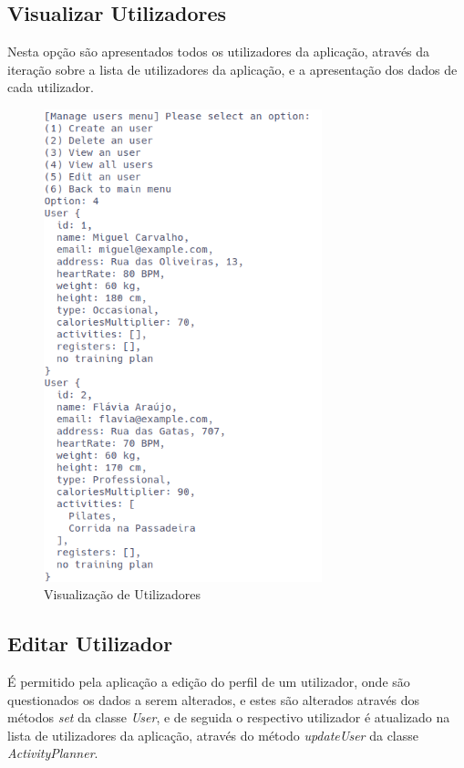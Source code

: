 \documentclass[a4paper,12pt]{scrreprt}
\begin{document}
    \clearpage
    \subsection{Visualizar Utilizadores}
    Nesta opção são apresentados todos os utilizadores da aplicação,
    através da iteração sobre a lista de utilizadores da aplicação,
    e a apresentação dos dados de cada utilizador.

    \begin{figure}[!ht]
        \centering
        \includegraphics[width=0.72\textwidth]{images/viewUsers.png}
        \caption{Visualização de Utilizadores}
        \label{fig:view-users}
    \end{figure}

    \clearpage
    \subsection{Editar Utilizador}
    É permitido pela aplicação a edição do perfil de um utilizador,
    onde são questionados os dados a serem alterados,
    e estes são alterados através dos métodos \textit{set} da classe \textit{User},
    e de seguida o respectivo utilizador é atualizado na lista de utilizadores da aplicação,
    através do método \textit{updateUser} da classe \textit{ActivityPlanner}.
\end{document}
